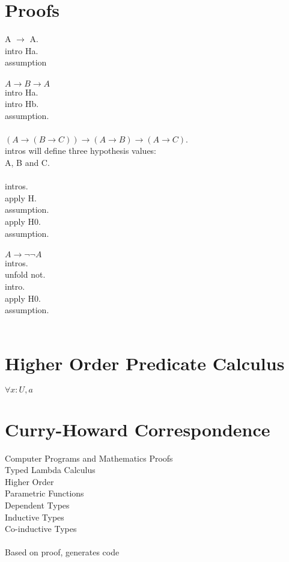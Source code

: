 \documentclass{article}
\begin{document}
\section{Proofs}
A $\rightarrow$ A.
\\
intro Ha.
\\
assumption
\\
\\
$A \rightarrow B \rightarrow A$
\\
intro Ha.
\\
intro Hb.
\\
assumption.
\\
\\
$(A \rightarrow (B \rightarrow C)) \rightarrow (A \rightarrow B) \rightarrow (A \rightarrow C)$.
\\
intros will define three hypothesis values: 
\\
A, B and C.
\\
\\
intros.
\\
apply H.
\\
assumption.
\\
apply H0.
\\
assumption.
\\
\\
$A \rightarrow \neg \neg A$
\\
intros.
\\
unfold not.
\\
intro.
\\
apply H0.
\\
assumption.
\\
\\
\section{Higher Order Predicate Calculus}
$\forall x: U, a$
\\
\section{Curry-Howard Correspondence}
Computer Programs and Mathematics Proofs
\\
Typed Lambda Calculus
\\
Higher Order
\\
Parametric Functions
\\
Dependent Types
\\
Inductive Types
\\
Co-inductive Types
\\
\\
Based on proof, generates code
\\
\\
\end{document}
